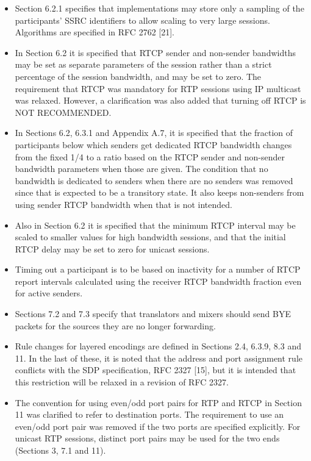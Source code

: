 \documentclass{article}
\begin{document}
\begin{itemize}
Other functional changes were:

\item Section 6.2.1 specifies that implementations may store only a sampling of the participants' SSRC identifiers to allow scaling to very large sessions.  Algorithms are specified in RFC 2762 [21].
\item In Section 6.2 it is specified that RTCP sender and non-sender bandwidths may be set as separate parameters of the session rather than a strict percentage of the session bandwidth, and may be set to zero.  The requirement that RTCP was mandatory for RTP sessions using IP multicast was relaxed.  However, a clarification was also added that turning off RTCP is NOT RECOMMENDED.
\item In Sections 6.2, 6.3.1 and Appendix A.7, it is specified that the fraction of participants below which senders get dedicated RTCP bandwidth changes from the fixed 1/4 to a ratio based on the RTCP sender and non-sender bandwidth parameters when those are given. The condition that no bandwidth is dedicated to senders when there are no senders was removed since that is expected to be a transitory state.  It also keeps non-senders from using sender RTCP bandwidth when that is not intended.
\item Also in Section 6.2 it is specified that the minimum RTCP interval may be scaled to smaller values for high bandwidth sessions, and that the initial RTCP delay may be set to zero for unicast sessions.
\item Timing out a participant is to be based on inactivity for a number of RTCP report intervals calculated using the receiver RTCP bandwidth fraction even for active senders.
\item Sections 7.2 and 7.3 specify that translators and mixers should send BYE packets for the sources they are no longer forwarding.
\item Rule changes for layered encodings are defined in Sections 2.4, 6.3.9, 8.3 and 11.  In the last of these, it is noted that the address and port assignment rule conflicts with the SDP specification, RFC 2327 [15], but it is intended that this restriction will be relaxed in a revision of RFC 2327.
\item The convention for using even/odd port pairs for RTP and RTCP in Section 11 was clarified to refer to destination ports.  The requirement to use an even/odd port pair was removed if the two ports are specified explicitly.  For unicast RTP sessions, distinct port pairs may be used for the two ends (Sections 3, 7.1 and 11).

\end{itemize}
\end{document}
